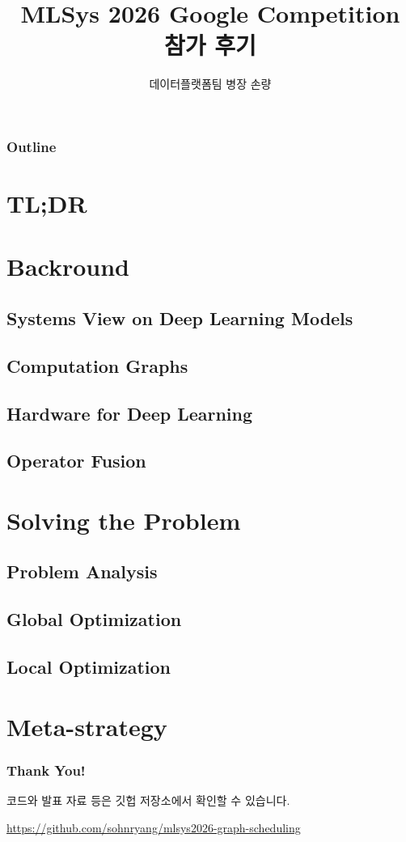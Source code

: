 \documentclass[aspectratio=169,mathserif]{beamer}
\title{MLSys 2026 Google Competition 참가 후기}
\author{데이터플랫폼팀 병장 손량}
\begin{document}
\begin{frame}
\maketitle
\end{frame}

\begin{frame}
\frametitle{Outline}
\tableofcontents
\end{frame}

\section{TL;DR}


\section{Backround}

\subsection{Systems View on Deep Learning Models}


\subsection{Computation Graphs}


\subsection{Hardware for Deep Learning}


\subsection{Operator Fusion}


\section{Solving the Problem}

\subsection{Problem Analysis}


\subsection{Global Optimization}


\subsection{Local Optimization}


\section{Meta-strategy}


\begin{frame}
\frametitle{Thank You!}

코드와 발표 자료 등은 깃헙 저장소에서 확인할 수 있습니다.

\url{https://github.com/sohnryang/mlsys2026-graph-scheduling}
\end{frame}
\end{document}
